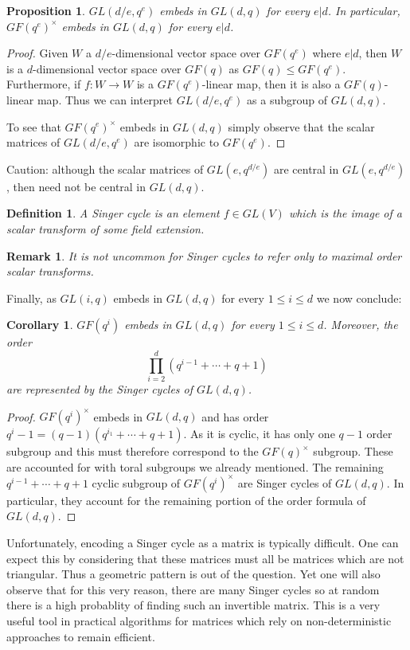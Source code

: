 \documentclass[12pt]{article}
\newtheorem{coro}[thm]{Corollary}
\newtheorem{prop}[thm]{Proposition}
\newtheorem{defn}[thm]{Definition}
\newtheorem{remark}[thm]{Remark}
\begin{document}
\begin{prop}
$GL(d/e,q^{e})$ embeds in $GL(d,q)$ for every $e|d$.  In particular,
$GF(q^e)^\times$ embeds in $GL(d,q)$ for every $e|d$.
\end{prop}
\begin{proof}
Given $W$ a $d/e$-dimensional vector space over $GF(q^e)$ where $e|d$, 
then $W$ is a $d$-dimensional vector space over $GF(q)$ as $GF(q)\leq GF(q^e)$.
Furthermore, if $f:W\rightarrow W$ is a $GF(q^e)$-linear map, then it is
also a $GF(q)$-linear map.  Thus we can interpret $GL(d/e,q^{e})$ as a 
subgroup of $GL(d,q)$.

To see that $GF(q^e)^\times$ embeds in $GL(d,q)$ simply observe that the
scalar matrices of $GL(d/e,q^{e})$ are isomorphic to $GF(q^e)$.
\end{proof}

Caution: although the scalar matrices of $GL(e,q^{d/e})$ are central in 
$GL(e,q^{d/e})$, then need not be central in $GL(d,q)$.

\begin{defn}
A \emph{Singer cycle} is an element $f\in GL(V)$ which is the image of
a scalar transform of some field extension.
\end{defn}

\begin{remark}
It is not uncommon for Singer cycles to refer only to maximal order scalar
transforms.
\end{remark}

Finally, as $GL(i,q)$ embeds in $GL(d,q)$ for every $1\leq i\leq d$ we now 
conclude:

\begin{coro}
$GF(q^i)$ embeds in $GL(d,q)$ for every $1\leq i\leq d$.  Moreover, the
order 
\[\prod_{i=2}^d (q^{i-1}+\cdots +q+1)\]
are represented by the Singer cycles of $GL(d,q)$.
\end{coro}
\begin{proof}
$GF(q^i)^\times$ embeds in $GL(d,q)$ and has order $q^i-1=(q-1)(q^{i_1}+\cdots+q+1)$.  As it is cyclic, it has only one $q-1$
order subgroup and this must therefore correspond to the $GF(q)^\times$
subgroup.  These are accounted for with toral subgroups we already mentioned.  The remaining $q^{i-1}+\cdots +q+1$ cyclic subgroup of $GF(q^i)^\times$ are
Singer cycles of $GL(d,q)$.  In particular, they account for the remaining
portion of the order formula of $GL(d,q)$.
\end{proof}

Unfortunately, encoding a Singer cycle as a matrix is typically difficult.  One can expect this by considering that these matrices must all be matrices which are not triangular.  Thus a geometric pattern is out of the question.  Yet one will also observe that for this very reason, there are many Singer cycles so at random there is a high probablity of finding such an invertible matrix.  This is a very useful tool in practical algorithms for matrices which rely on non-deterministic approaches to remain efficient.
\end{document}
